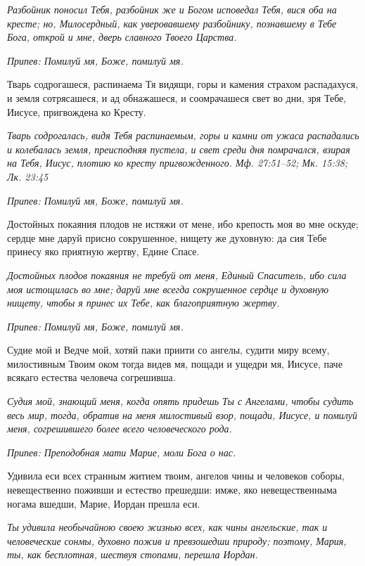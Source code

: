 \itshape Разбойник поносил Тебя, разбойник же и Богом исповедал Тебя, вися оба на кресте; но, Милосердный, как уверовавшему разбойнику, познавшему в Тебе Бога, открой и мне, дверь славного Твоего Царства.\normalfont{}


\itshape Припев:\normalfont{} Помилуй мя, Боже, помилуй мя.


Тварь содрогашеся, распинаема Тя видящи, горы и камения страхом распадахуся, и земля сотрясашеся, и ад обнажашеся, и соомрачашеся свет во дни, зря Тебе, Иисусе, пригвождена ко Кресту.


\itshape Тварь содрогалась, видя Тебя распинаемым, горы и камни от ужаса распадались и колебалась земля, преисподняя пустела, и свет среди дня помрачался, взирая на Тебя, Иисус, плотию ко кресту пригвожденного. Мф. 27:51–52; Мк. 15:38; Лк. 23:45\normalfont{}


\itshape Припев:\normalfont{} Помилуй мя, Боже, помилуй мя.


Достойных покаяния плодов не истяжи от мене, ибо крепость моя во мне оскуде; сердце мне даруй присно сокрушенное, нищету же духовную: да сия Тебе принесу яко приятную жертву, Едине Спасе.


\itshape Достойных плодов покаяния не требуй от меня, Единый Спаситель, ибо сила моя истощилась во мне; даруй мне всегда сокрушенное сердце и духовную нищету, чтобы я принес их Тебе, как благоприятную жертву.\normalfont{}


\itshape Припев:\normalfont{} Помилуй мя, Боже, помилуй мя.


Судие мой и Ведче мой, хотяй паки приити со ангелы, судити миру всему, милостивным Твоим оком тогда видев мя, пощади и ущедри мя, Иисусе, паче всякаго естества человеча согрешивша.


\itshape Судия мой, знающий меня, когда опять придешь Ты с Ангелами, чтобы судить весь мир, тогда, обратив на меня милостивый взор, пощади, Иисусе, и помилуй меня, согрешившего более всего человеческого рода.\normalfont{}


\itshape Припев:\normalfont{} Преподобная мати Марие, моли Бога о нас.


Удивила еси всех странным житием твоим, ангелов чины и человеков соборы, невещественно поживши и естество прешедши: имже, яко невещественныма ногама вшедши, Марие, Иордан прешла еси.


\itshape Ты удивила необычайною своею жизнью всех, как чины ангельские, так и человеческие сонмы, духовно пожив и превзошедши природу; поэтому, Мария, ты, как бесплотная, шествуя стопами, перешла Иордан.\normalfont{}


